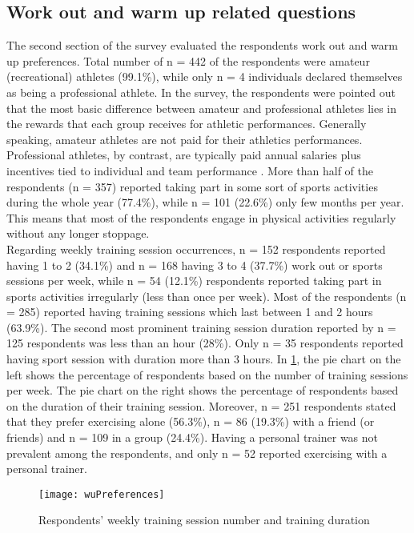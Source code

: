 \subsection{Work out and warm up related questions}
The second section of the survey evaluated the respondents work out and warm up preferences. Total number of n = 442 of the respondents were amateur (recreational) athletes (99.1\%), while only n = 4 individuals declared themselves as being a professional athlete. In the survey, the respondents were pointed out that the most basic difference between amateur and professional athletes lies in the rewards that each group receives for athletic performances. Generally speaking, amateur athletes are not paid for their athletics performances. Professional athletes, by contrast, are typically paid annual salaries plus incentives tied to individual and team performance \cite{amateurvsproffesional}. More than half of the respondents (n = 357) reported taking part in some sort of sports activities during the whole year (77.4\%), while n = 101 (22.6\%) only few months per year. This means that most of the respondents engage in physical activities regularly without any longer stoppage.\\Regarding weekly training session occurrences, n = 152 respondents reported having 1 to 2 (34.1\%) and n = 168 having 3 to 4 (37.7\%) work out or sports sessions per week, while n = 54 (12.1\%) respondents reported taking part in sports activities irregularly (less than once per week). Most of the respondents (n = 285) reported having training sessions which last between 1 and 2 hours (63.9\%). The second most prominent training session duration reported by n = 125 respondents was less than an hour (28\%). Only n = 35 respondents reported having sport session with duration more than 3 hours. In \ref{fig:wuPreferences}, the pie chart on the left shows the percentage of respondents based on the number of training sessions per week. The pie chart on the right shows the percentage of respondents based on the duration of their training session. Moreover, n = 251 respondents stated that they prefer exercising alone (56.3\%), n = 86 (19.3\%) with a friend (or friends) and n = 109 in a group (24.4\%). Having a personal trainer was not prevalent among the respondents, and only n = 52 reported exercising with a personal trainer. 
\begin{figure}[h]
    \centering
    \texttt{[image: wuPreferences]}
    \caption{Respondents' weekly training session number and training duration}
    \label{fig:wuPreferences}
\end{figure}\\
